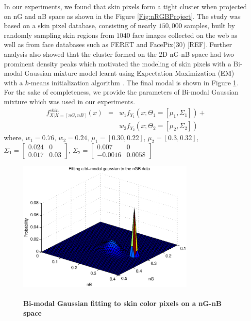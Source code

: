 \documentclass[times, 10pt,twocolumn]{article}
\begin{document}
In our experiments, we found that skin pixels form a tight cluster
when projected on nG and nB space as shown in the Figure
\ref{Fig:nRGBProject}. The study was based on a skin pixel database,
consisting of nearly $150,000$ samples, built by randomly sampling
skin regions from $1040$ face images collected on the web as well as
from face databases such as FERET \cite{phillips_feret_1997} and
FacePix(30) [REF]. Further analysis also showed that the cluster
formed on the 2D nG-nB space had two prominent density peaks which
motivated the modeling of skin pixels with a Bi-modal Gaussian
mixture model learnt using Expectation Maximization (EM) with a
$k$-means initialization algorithm \cite{bilmes_gentle_1998}. The
final modal is shown in Figure \ref{Fig:BimodGaussian}. For the sake
of completeness, we provide the parameters of Bi-modal Gaussian
mixture which was used in our experiments.
\begin{eqnarray}
f^{skin}_{X|X=[nG,nB]}(x) & = & w_1 f_{Y_1}(x;\Theta_1=[\mu_1,\Sigma_1]) +  \nonumber  \\
       &  & w_2 f_{Y_2}(x;\Theta_2=[\mu_2,\Sigma_2])
\end{eqnarray}
where, $w_1 = 0.76$, $w_2 = 0.24$, $\mu_1 = [0.30,0.22]$, $\mu_2 =
[0.3, 0.32]$, $\Sigma_1=\left[ \begin{array}{cc} 0.024 & 0
\\ 0.017 & 0.03\end{array}\right]$, $\Sigma_2=\left[ \begin{array}{cc} 0.007 & 0
\\ -0.0016 & 0.0058\end{array}\right]$
\vspace{-0.15in}
\begin{figure}[h]
\centering
\includegraphics[width=3.5in]{Figure4.eps}
\caption{{\bf {\selectfont \\ Bi-modal Gaussian
fitting to skin color pixels on a nG-nB space}}}
\label{Fig:BimodGaussian}
\end{figure}
\end{document}
